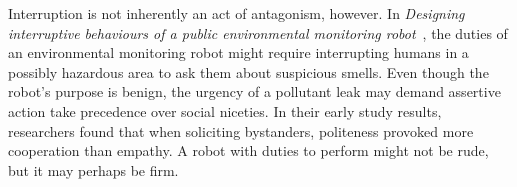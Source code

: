 \documentclass{sfuthesis}
\begin{document}
Interruption is not inherently an act of antagonism, however. In \textit{Designing interruptive behaviours of a public environmental monitoring robot}~\cite{evers2011designing}, the duties of an environmental monitoring robot might require interrupting humans in a possibly hazardous area to ask them about suspicious smells. Even though the robot's purpose is benign, the urgency of a pollutant leak may demand assertive action take precedence over social niceties. In their early study results, researchers found that when soliciting bystanders, politeness provoked more cooperation than empathy. A robot with duties to perform might not be rude, but it may perhaps be firm.










\end{document}
